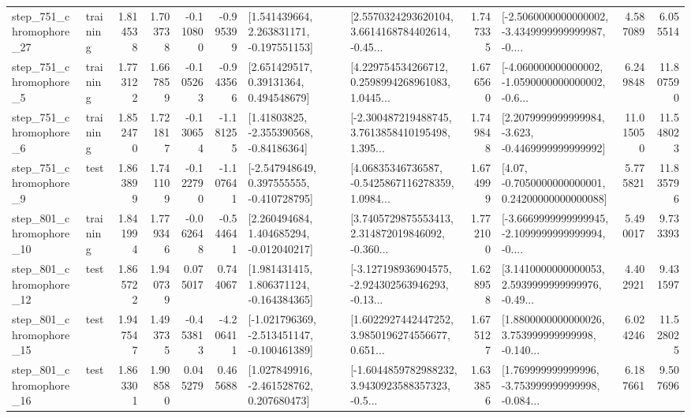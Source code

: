 \begin{tabular}{llrrrrllrlrr}
  step\_751\_chromophore\_27 &  training &      1.814538 &    1.703738 &     -0.110800 & -0.995399 &    [1.541439664, 2.263831171, -0.197551153] &  [2.5570324293620104, 3.6614168784402614, -0.45... &       1.747335 &  [-2.5060000000000002, -3.4349999999999987, -0.... &            4.587089 &          6.055514 \\
   step\_751\_chromophore\_5 &  training &      1.773122 &    1.667859 &     -0.105263 & -0.943566 &      [2.651429517, 0.39131364, 0.494548679] &  [4.229754534266712, 0.2598994268961083, 1.0445... &       1.676560 &  [-4.060000000000002, -1.0590000000000002, -0.6... &            6.249848 &         11.807590 \\
   step\_751\_chromophore\_6 &  training &      1.852470 &    1.721817 &     -0.130654 & -1.181255 &     [1.41803825, -2.355390568, -0.84186364] &  [-2.300487219488745, 3.7613858410195498, 1.395... &       1.749848 &  [2.2079999999999984, -3.623, -0.4469999999999992] &           11.015050 &         11.548023 \\
   step\_751\_chromophore\_9 &      test &      1.863899 &    1.741109 &     -0.122790 & -1.107641 &   [-2.547948649, 0.397555555, -0.410728795] &  [4.06835346736587, -0.5425867116278359, 1.0984... &       1.674999 &   [4.07, -0.7050000000000001, 0.24200000000000088] &            5.775821 &         11.835796 \\
  step\_801\_chromophore\_10 &  training &      1.841994 &    1.779346 &     -0.062648 & -0.544641 &    [2.260494684, 1.404685294, -0.012040217] &  [3.7405729875553413, 2.314872019846092, -0.360... &       1.772100 &  [-3.6669999999999945, -2.1099999999999994, -0.... &            5.490017 &          9.733393 \\
  step\_801\_chromophore\_12 &      test &      1.865722 &    1.940739 &      0.075017 &  0.744067 &    [1.981431415, 1.806371124, -0.164384365] &  [-3.127198936904575, -2.924302563946293, -0.13... &       1.628958 &  [3.1410000000000053, 2.5939999999999976, -0.49... &            4.402921 &          9.431597 \\
  step\_801\_chromophore\_15 &      test &      1.947547 &    1.493735 &     -0.453813 & -4.206411 &  [-1.021796369, -2.513451147, -0.100461389] &  [1.6022927442447252, 3.9850196274556677, 0.651... &       1.675127 &  [1.8800000000000026, 3.753999999999998, -0.140... &            6.024246 &         11.528025 \\
  step\_801\_chromophore\_16 &      test &      1.863301 &    1.908580 &      0.045279 &  0.465688 &    [1.027849916, -2.461528762, 0.207680473] &  [-1.6044859782988232, 3.9430923588357323, -0.5... &       1.633856 &  [1.769999999999996, -3.753999999999998, -0.084... &            6.187661 &          9.507696 \\

\end{tabular}
